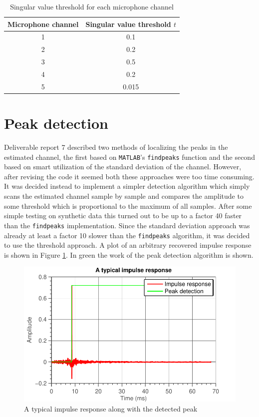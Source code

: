 \documentclass[11pt,titlepage]{report}
\begin{document}

\begin{table}[H]
\centering
\begin{tabular}{ c | c}
\hline \hline
Microphone channel & Singular value threshold $t$ \\
\hline
1 & \num{0.1} \\ 
2 & \num{0.2} \\
3 & \num{0.5} \\
4 & \num{0.2} \\
5 & \num{0.015} \\
\end{tabular}
\caption{Singular value threshold for each microphone channel}
\label{tab:loc_svd_value}
\end{table}

\section{Peak detection}
\label{sec:loc_peak}
Deliverable report 7 \cite{epo4-del7} described two methods of localizing the peaks in the estimated channel, the first based on \texttt{MATLAB}'s \texttt{findpeaks} function and the second based on smart utilization of the standard deviation of the channel. However, after revising the code it seemed both these approaches were too time consuming. It was decided instead to implement a simpler detection algorithm which simply scans the estimated channel sample by sample and compares the amplitude to some threshold which is proportional to the maximum of all samples. After some simple testing on synthetic data this turned out to be up to a factor \num{40} faster than the \texttt{findpeaks} implementation. Since the standard deviation approach was already at least a factor \num{10} slower than the \texttt{findpeaks} algorithm, it was decided to use the threshold approach. 
A plot of an arbitrary recovered impulse response is shown in Figure \ref{fig:localization-typical-impulse}. In green the work of the peak detection algorithm is shown. 

\begin{figure}[H]
	\centering
	\includegraphics[width=0.5\linewidth]{resource/typical-impulse.pdf}
	\caption{A typical impulse response along with the detected peak}
	\label{fig:localization-typical-impulse}
\end{figure}
\end{document}
